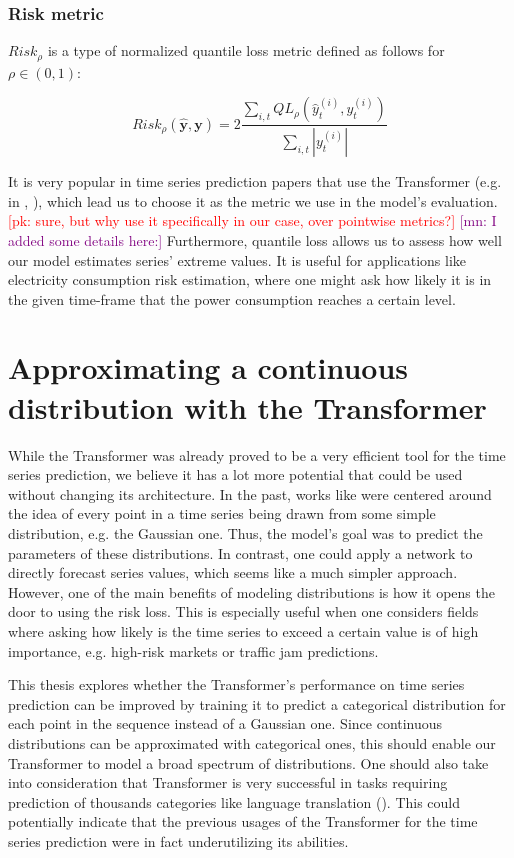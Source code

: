 \documentclass[en]{pracamgr}
\newcommand{\pk}[1]{\textcolor{red}{\small [pk: #1]}}
\newcommand{\mn}[1]{\textcolor{purple}{\small [mn: #1]}}
\begin{document}
\subsection{Risk metric}

$Risk_\rho$ is a type of normalized quantile loss metric defined as follows for $\rho \in (0,1)$:

$$ Risk_\rho(\hat{\textbf{y}}, \textbf{y}) 
= 2\frac{\sum_{i,t}QL_\rho(\hat{y}^{(i)}_t, y^{(i)}_t)}
{\sum_{i,t} |y^{(i)}_t|}$$

It is very popular in time series prediction papers that use the Transformer (e.g. in \cite{enhancing}, \cite{deepar}), which lead us to choose it as the metric we use in the model's evaluation. \pk{sure, but why use it specifically in our case, over pointwise metrics?} \mn{I added some details here:} Furthermore, quantile loss allows us to assess how well our model estimates series' extreme values. It is useful for applications like electricity consumption risk estimation, where one might ask how likely it is in the given time-frame that the power consumption reaches a certain level. 

\chapter{Approximating a continuous distribution with the Transformer}

While the Transformer was already proved to be a very efficient tool for the time series prediction, we believe it has a lot more potential that could be used without changing its architecture. In the past, works like \cite{enhancing} were centered around the idea of every point in a time series being drawn from some simple distribution, e.g. the Gaussian one. Thus, the model's goal was to predict the parameters of these distributions.
In contrast, one could apply a network to directly forecast series values, which seems like a much simpler approach. However, one of the main benefits of modeling distributions is how it opens the door to using the risk loss. This is especially useful when one considers fields where asking how likely is the time series to exceed a certain value is of high importance, e.g. high-risk markets or traffic jam predictions.

This thesis explores whether the Transformer's performance on time series prediction can be improved by training it to predict a categorical distribution for each point in the sequence instead of a Gaussian one. Since continuous distributions can be approximated with categorical ones, this should enable our Transformer to model a broad spectrum of distributions. One should also take into consideration that Transformer is very successful in tasks requiring prediction of thousands categories like language translation (\cite{tr}). This could potentially indicate that the previous usages of the Transformer for the time series prediction were in fact underutilizing its abilities.
\end{document}
